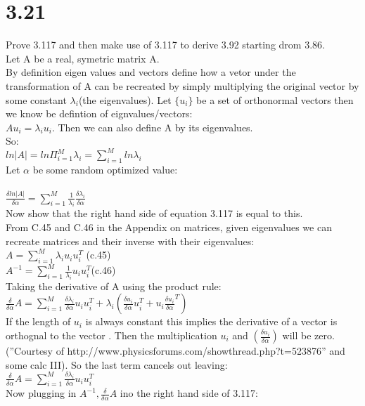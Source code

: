\documentclass[11pt,leqno,fleqn]{article}
\begin{document}
\section{3.21}
Prove 3.117 and then make use of 3.117 to derive 3.92 starting drom 3.86.\\
Let A be a real, symetric matrix A.\\
By definition eigen values and vectors define how a vetor under the transformation of A can be recreated by simply multiplying the original vector by some constant $\lambda_i$(the eigenvalues). Let $\{ u_i \}$ be a set of orthonormal vectors then we know be defintion of eignvalues/vectors:\\
$Au_i = \lambda_i u_i$. Then we can also define A by its eigenvalues.\\
So:\\
$ln|A| = ln \Pi_{i=1}^M \lambda_i = \sum_{i = 1}^M ln \lambda_i$\\
Let $\alpha$ be some random optimized value:\\
\\
$\frac{\delta ln|A|}{\delta \alpha}  = \sum_{i = 1}^M \frac{1}{\lambda_i} \frac{\delta \lambda_i}{\delta \alpha}$\\
Now show that the right hand side of equation 3.117 is equal to this.\\
From C.45 and C.46 in the Appendix on matrices, given eigenvalues we can recreate matrices and their inverse with their eigenvalues:\\
$A = \sum_{i=1}^M \lambda_i u_i u_i^T$ (c.45)\\
$A^{-1} =  \sum_{i = 1}^M \frac{1}{\lambda_i} u_i u_i^T$(c.46)\\
Taking the derivative of A using the product rule:\\
$\frac{\delta}{\delta \alpha}A = \sum_{i=1}^M \frac{\delta \lambda_i}{\delta \alpha} u_i u_i^T +  \lambda_i (\frac{\delta u_i}{\delta \alpha} u_i^T + u_i \frac{\delta u_i}{\delta \alpha}^T )$\\
If the length of $u_i$ is always constant this implies the derivative of a vector is orthognal to the vector . Then the multiplication $u_i$ and $(\frac{\delta u_i}{\delta \alpha})$ will be zero. (''Courtesy of http://www.physicsforums.com/showthread.php?t=523876'' and some calc III). So the last term cancels out leaving:\\
$\frac{\delta}{\delta \alpha}A = \sum_{i=1}^M \frac{\delta \lambda_i}{\delta \alpha} u_i u_i^T$\\
Now plugging in $A^{-1}, \frac{\delta}{\delta \alpha}A$ ino the right hand side of 3.117:\\
\end{document}
